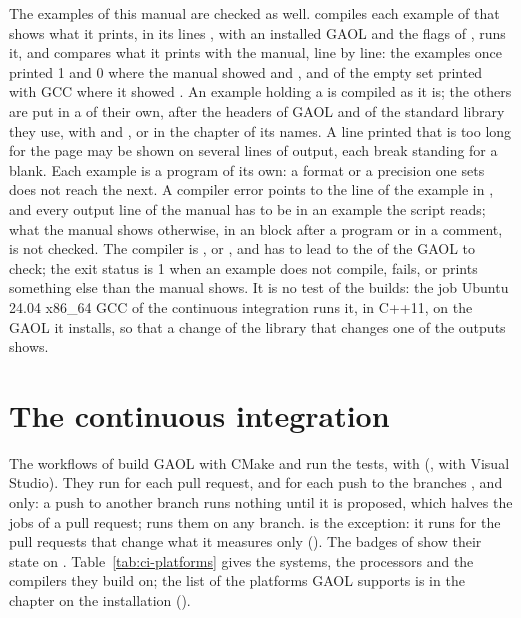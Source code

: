 \documentclass[12pt,a4paper,twoside,openright]{book}
\begin{document}
\medskip
{}%
The examples of this manual are checked as well.
 compiles each example of
 that shows what it
prints, in its lines , with an installed GAOL and the flags
of , runs it, and compares what it prints with the
manual, line by line:\newinvfive{} the examples once printed 1 and 0 where
the manual showed  and , and  of the
empty set printed  with GCC where it showed . An
example holding a  is compiled as it is; the others are put in
a  of their own, after the headers of GAOL and of the standard
library they use, with  and
, or  in the chapter of its
names. A line printed that is too long for the page may be shown on several
lines of output, each break standing for a blank. Each example is a program
of its own: a format or a precision one sets does not reach the next. A
compiler error points to the line of the example in , and
every output line of the manual has to be in an example the script reads;
what the manual shows otherwise, in an  block after a
program or in a comment, is not checked. The compiler is , or
, and  has to lead to the  of
the GAOL to check; the exit status is 1 when an example does not compile,
fails, or prints something else than the manual shows. It is no test of the
builds: the job Ubuntu 24.04 x86\_64 GCC of the continuous integration runs
it, in C++11, on the GAOL it installs, so that a change of the library that
changes one of the outputs shows.

\section{The continuous integration}\label{sec:ci}

The workflows of  build GAOL with CMake and run the
tests, with  (,
 with Visual Studio). They run for each pull request, and
for each push to the branches ,  and
 only: a push to another branch runs nothing until it
is proposed, which halves the jobs of a pull request;\newinvfive{}
 runs them on any branch. 
is the exception: it runs for the pull requests that change what it
measures only (). The badges of  show
their state on . Table~\ref{tab:ci-platforms} gives
the systems, the processors and the compilers they build on; the list of
the platforms GAOL supports is in the chapter on the installation
().
\end{document}
